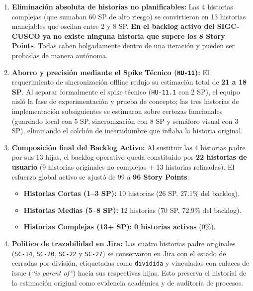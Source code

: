 \begin{enumerate}
    \item \textbf{Eliminación absoluta de historias no planificables:} Las 4 historias complejas (que sumaban 60 SP de alto riesgo) se convirtieron en 13 historias manejables que oscilan entre 2 y 8 SP. \textbf{En el backlog activo del SIGC-CUSCO ya no existe ninguna historia que supere los 8 Story Points}. Todas caben holgadamente dentro de una iteración y pueden ser probadas de manera autónoma.
    
    \item \textbf{Ahorro y precisión mediante el Spike Técnico (\texttt{HU-11}):} El requerimiento de sincronización offline redujo su estimación total de \textbf{21 a 18 SP}. Al separar formalmente el spike técnico (\texttt{HU-11.1} con 2 SP), el equipo aisló la fase de experimentación y prueba de concepto; las tres historias de implementación subsiguientes se estimaron sobre certezas funcionales (guardado local con 5 SP, sincronización con 8 SP y semáforo visual con 3 SP), eliminando el colchón de incertidumbre que inflaba la historia original.
    
    \item \textbf{Composición final del Backlog Activo:} Al sustituir las 4 historias padre por sus 13 hijas, el backlog operativo queda constituido por \textbf{22 historias de usuario} (9 historias originales no complejas + 13 historias refinadas). El esfuerzo global activo se ajustó de 99 a \textbf{96 Story Points}:
    \begin{itemize}
        \item \textbf{Historias Cortas (1--3 SP):} 10 historias (26 SP, 27.1\% del backlog).
        \item \textbf{Historias Medias (5--8 SP):} 12 historias (70 SP, 72.9\% del backlog).
        \item \textbf{Historias Complejas (13+ SP):} \textbf{0 historias activas} (0\%).
    \end{itemize}
    
    \item \textbf{Política de trazabilidad en Jira:} Las cuatro historias padre originales (\texttt{SC-14}, \texttt{SC-20}, \texttt{SC-22} y \texttt{SC-27}) se conservaron en Jira con el estado de cerradas por división, etiquetadas como \texttt{dividida} y vinculadas con enlaces de issue (\textit{\enquote{is parent of}}) hacia sus respectivas hijas. Esto preserva el historial de la estimación original como evidencia académica y de auditoría de procesos.
\end{enumerate}
